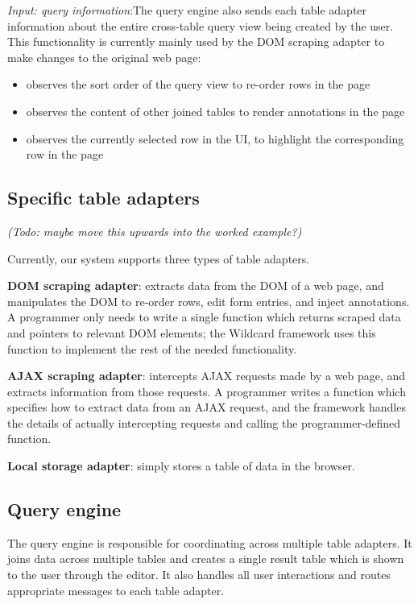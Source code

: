 \documentclass[sigplan,10pt,anonymous,review]{acmart}
\providecommand{\tightlist}{%
  \setlength{\itemsep}{0pt}\setlength{\parskip}{0pt}}
\begin{document}
\emph{Input: query information}:The query engine also sends each table
adapter information about the entire cross-table query view being
created by the user. This functionality is currently mainly used by the
DOM scraping adapter to make changes to the original web page:

\begin{itemize}
\tightlist
\item
  observes the sort order of the query view to re-order rows in the page
\item
  observes the content of other joined tables to render annotations in
  the page
\item
  observes the currently selected row in the UI, to highlight the
  corresponding row in the page
\end{itemize}

\hypertarget{specific-table-adapters}{%
\subsection{Specific table adapters}\label{specific-table-adapters}}

\emph{(Todo: maybe move this upwards into the worked example?)}

Currently, our system supports three types of table adapters.

\textbf{DOM scraping adapter}: extracts data from the DOM of a web page,
and manipulates the DOM to re-order rows, edit form entries, and inject
annotations. A programmer only needs to write a single function which
returns scraped data and pointers to relevant DOM elements; the Wildcard
framework uses this function to implement the rest of the needed
functionality.

\textbf{AJAX scraping adapter}: intercepts AJAX requests made by a web
page, and extracts information from those requests. A programmer writes
a function which specifies how to extract data from an AJAX request, and
the framework handles the details of actually intercepting requests and
calling the programmer-defined function.

\textbf{Local storage adapter}: simply stores a table of data in the
browser.

\hypertarget{query-engine}{%
\subsection{Query engine}\label{query-engine}}

The query engine is responsible for coordinating across multiple table
adapters. It joins data across multiple tables and creates a single
result table which is shown to the user through the editor. It also
handles all user interactions and routes appropriate messages to each
table adapter.
\end{document}
